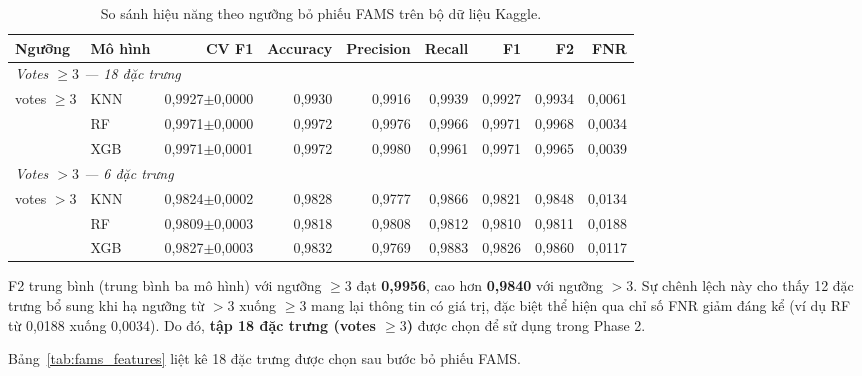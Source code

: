 \begin{table}[!t]
\caption{So sánh hiệu năng theo ngưỡng bỏ phiếu FAMS trên bộ dữ liệu Kaggle.}
\label{tab:phase1_eval}
\begin{center}
\begin{adjustbox}{width=\textwidth}
\begin{tabular}{|l|l|r|r|r|r|r|r|r|}
\hline
\textbf{Ngưỡng} & \textbf{Mô hình} & \textbf{CV F1} & \textbf{Accuracy} & \textbf{Precision} & \textbf{Recall} & \textbf{F1} & \textbf{F2} & \textbf{FNR} \\
\hline
\multicolumn{9}{|l|}{\textit{Votes $\geq 3$ --- 18 đặc trưng}} \\
\hline
votes $\geq 3$ & KNN & 0,9927$\pm$0,0000 & 0,9930 & 0,9916 & 0,9939 & 0,9927 & 0,9934 & 0,0061 \\
               & RF  & 0,9971$\pm$0,0000 & 0,9972 & 0,9976 & 0,9966 & 0,9971 & 0,9968 & 0,0034 \\
               & XGB & 0,9971$\pm$0,0001 & 0,9972 & 0,9980 & 0,9961 & 0,9971 & 0,9965 & 0,0039 \\
\hline
\multicolumn{9}{|l|}{\textit{Votes $> 3$ --- 6 đặc trưng}} \\
\hline
votes $> 3$    & KNN & 0,9824$\pm$0,0002 & 0,9828 & 0,9777 & 0,9866 & 0,9821 & 0,9848 & 0,0134 \\
               & RF  & 0,9809$\pm$0,0003 & 0,9818 & 0,9808 & 0,9812 & 0,9810 & 0,9811 & 0,0188 \\
               & XGB & 0,9827$\pm$0,0003 & 0,9832 & 0,9769 & 0,9883 & 0,9826 & 0,9860 & 0,0117 \\
\hline
\end{tabular}
\end{adjustbox}
\end{center}
\end{table}

F2 trung bình (trung bình ba mô hình) với ngưỡng $\geq 3$ đạt \textbf{0,9956}, cao hơn \textbf{0,9840} với ngưỡng $> 3$. Sự chênh lệch này cho thấy 12 đặc trưng bổ sung khi hạ ngưỡng từ $>3$ xuống $\geq 3$ mang lại thông tin có giá trị, đặc biệt thể hiện qua chỉ số FNR giảm đáng kể (ví dụ RF từ 0,0188 xuống 0,0034). Do đó, \textbf{tập 18 đặc trưng (votes $\geq 3$)} được chọn để sử dụng trong Phase 2.

Bảng~\ref{tab:fams_features} liệt kê 18 đặc trưng được chọn sau bước bỏ phiếu FAMS.

